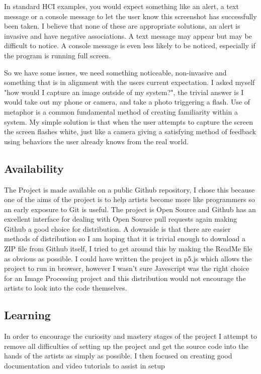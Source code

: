 \documentclass[a4paper]{report}
\begin{document}
In standard HCI examples, you would expect something like an alert, a text message or a console message to let the user know this screenshot has successfully been taken. I believe that none of these are appropriate solutions, an alert is invasive and have negative associations. A text message may appear but may be difficult to notice. A console message is even less likely to be noticed, especially if the program is running full screen.

So we have some issues, we need something noticeable, non-invasive and something that is in alignment with the users current expectation. I asked myself "how would I capture an image outside of my system?", the trivial answer is I would take out my phone or camera, and take a photo triggering a flash. Use of metaphor is a common fundamental method of creating familiarity within a system. My simple solution is that when the user attempts to capture the screen the screen flashes white, just like a camera giving a satisfying method of feedback using behaviors the user already knows from the real world. 

\subsection{Availability}
The Project is made available on a public Github repository\cite{GITHUB}, I chose this because one of the aims of the project is to help artists become more like programmers so an early exposure to Git is useful. The project is Open Source and Github has an excellent interface for dealing with Open Source pull requests again making Github a good choice for distribution. A downside is that there are easier methods of distribution so I am hoping that it is trivial enough to download a ZIP file from Github itself, I tried to get around this by making the ReadMe file as obvious as possible. I could have written the project in p5.js which allows the project to run in browser, however I wasn't sure Javescript was the right choice for an Image Processing project and this distribution would not encourage the artists to look into the code themselves.

\subsection{Learning}
In order to encourage the curiosity and mastery stages of the project I attempt to remove all difficulties of setting up the project and get the source code into the hands of the artists as simply as possible. I then focused on creating good documentation and video tutorials to assist in setup
\end{document}
